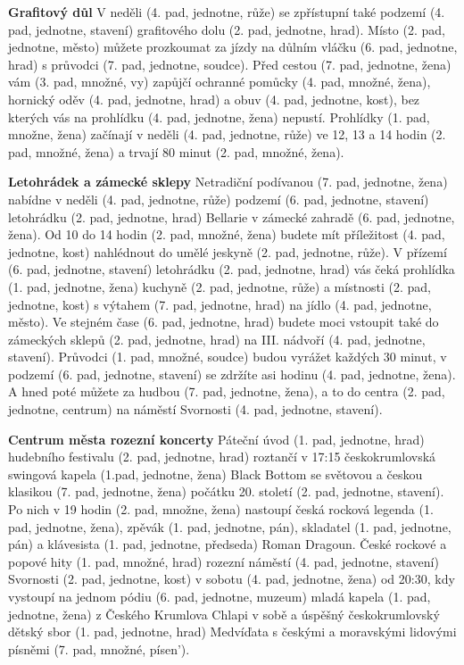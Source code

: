 \documentclass[12pt]{book}
\begin{document}
\textbf{Grafitový důl}
V neděli (4. pad, jednotne, růže) se zpřístupní také podzemí (4. pad, jednotne, stavení) 
grafitového dolu (2. pad, jednotne, hrad). Místo (2. pad, jednotne, město) můžete prozkoumat za jízdy 
na důlním vláčku (6. pad, jednotne, hrad) s průvodci (7. pad, jednotne, soudce). Před 
cestou (7. pad, jednotne, žena) vám (3. pad, množné, vy) zapůjčí ochranné pomůcky (4. pad, množné, žena), 
hornický oděv (4. pad, jednotne, hrad) a obuv (4. pad, jednotne, kost), bez kterých vás na 
prohlídku (4. pad, jednotne, žena) nepustí. Prohlídky (1. pad, množne, žena) začínají v 
neděli (4. pad, jednotne, růže) ve 12, 13 a 14 hodin (2. pad, množné, žena) a trvají 80 
minut (2. pad, množné, žena).

\textbf{Letohrádek a zámecké sklepy}
Netradiční podívanou (7. pad, jednotne, žena) nabídne v neděli (4. pad, jednotne, růže) 
podzemí (6. pad, jednotne, stavení) letohrádku (2. pad, jednotne, hrad) Bellarie v zámecké 
zahradě (6. pad, jednotne, žena). Od 10 do 14 hodin (2. pad, množné, žena) budete mít 
příležitost (4. pad, jednotne, kost) nahlédnout do umělé jeskyně (2. pad, jednotne, růže). 
V přízemí (6. pad, jednotne, stavení) letohrádku (2. pad, jednotne, hrad) vás čeká 
prohlídka (1. pad, jednotne, žena) kuchyně (2. pad, jednotne, růže) a místnosti (2. pad, jednotne, kost) 
s výtahem (7. pad, jednotne, hrad) na jídlo (4. pad, jednotne, město). Ve stejném 
čase (6. pad, jednotne, hrad) budete moci vstoupit také do zámeckých 
sklepů (2. pad, jednotne, hrad) na III. nádvoří (4. pad, jednotne, stavení). 
Průvodci (1. pad, množné, soudce) budou vyrážet každých 30 minut, v podzemí (6. pad, jednotne, stavení) 
se zdržíte asi hodinu (4. pad, jednotne, žena). A hned poté můžete za hudbou (7. pad, jednotne, žena), 
a to do centra (2. pad, jednotne, centrum) na náměstí Svornosti (4. pad, jednotne, stavení).

\textbf{Centrum města rozezní koncerty}
Páteční úvod (1. pad, jednotne, hrad) hudebního festivalu (2. pad, jednotne, hrad) roztančí v 17:15 
českokrumlovská swingová kapela (1.pad, jednotne, žena) Black Bottom se světovou a českou 
klasikou (7. pad, jednotne, žena) počátku 20. století (2. pad, jednotne, stavení). Po nich v 19 
hodin (2. pad, množne, žena) nastoupí česká rocková legenda (1. pad, jednotne, žena), 
zpěvák (1. pad, jednotne, pán), skladatel (1. pad, jednotne, pán) a 
klávesista (1. pad, jednotne, předseda) Roman Dragoun. České rockové a popové 
hity (1. pad, množné, hrad) rozezní náměstí (4. pad, jednotne, stavení) 
Svornosti (2. pad, jednotne, kost) v sobotu (4. pad, jednotne, žena) od 20:30, kdy vystoupí na 
jednom pódiu (6. pad, jednotne, muzeum) mladá kapela (1. pad, jednotne, žena) z Českého Krumlova 
Chlapi v sobě a úspěšný českokrumlovský dětský sbor (1. pad, jednotne, hrad) Medvíďata s českými 
a moravskými lidovými písněmi (7. pad, množné, písen').
\end{document}
